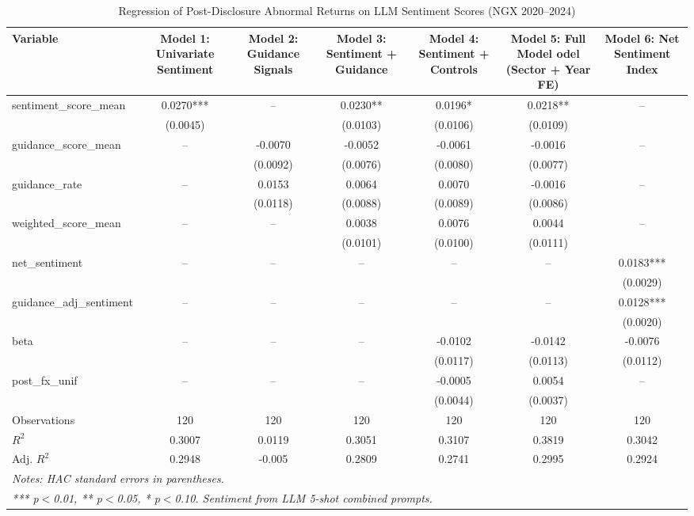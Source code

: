 

\begin{table}[h]
\centering
\small
\caption{Regression of Post-Disclosure Abnormal Returns on LLM Sentiment Scores (NGX 2020--2024)}
\label{tab:regression_CAR0_+3}
\begin{tabular}{lcccccc}
\hline
\textbf{Variable} & \textbf{Model 1: Univariate Sentiment} & \textbf{Model 2: Guidance Signals} & \textbf{Model 3: Sentiment + Guidance} & \textbf{Model 4: Sentiment + Controls} & \textbf{Model 5: Full Model odel (Sector + Year FE)} & \textbf{Model 6: Net Sentiment Index} \\
\hline
sentiment\_score\_mean & 0.0270*** & -- & 0.0230** & 0.0196* & 0.0218** & -- \\
 & (0.0045) &  & (0.0103) & (0.0106) & (0.0109) &  \\
guidance\_score\_mean & -- & -0.0070 & -0.0052 & -0.0061 & -0.0016 & -- \\
 &  & (0.0092) & (0.0076) & (0.0080) & (0.0077) &  \\
guidance\_rate & -- & 0.0153 & 0.0064 & 0.0070 & -0.0016 & -- \\
 &  & (0.0118) & (0.0088) & (0.0089) & (0.0086) &  \\
weighted\_score\_mean & -- & -- & 0.0038 & 0.0076 & 0.0044 & -- \\
 &  &  & (0.0101) & (0.0100) & (0.0111) &  \\
net\_sentiment & -- & -- & -- & -- & -- & 0.0183*** \\
 &  &  &  &  &  & (0.0029) \\
guidance\_adj\_sentiment & -- & -- & -- & -- & -- & 0.0128*** \\
 &  &  &  &  &  & (0.0020) \\
beta & -- & -- & -- & -0.0102 & -0.0142 & -0.0076 \\
 &  &  &  & (0.0117) & (0.0113) & (0.0112) \\
post\_fx\_unif & -- & -- & -- & -0.0005 & 0.0054 & -- \\
 &  &  &  & (0.0044) & (0.0037) &  \\
\hline
Observations & 120 & 120 & 120 & 120 & 120 & 120 \\
$R^2$ & 0.3007 & 0.0119 & 0.3051 & 0.3107 & 0.3819 & 0.3042 \\
Adj. $R^2$ & 0.2948 & -0.005 & 0.2809 & 0.2741 & 0.2995 & 0.2924 \\
\hline
\multicolumn{7}{l}{\textit{Notes: HAC standard errors in parentheses. }} \\
\multicolumn{7}{l}{\textit{*** p$<$0.01, ** p$<$0.05, * p$<$0.10. Sentiment from LLM 5-shot combined prompts.}} \\
\end{tabular}
\end{table}


